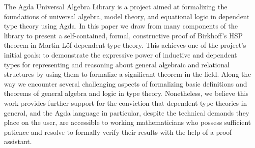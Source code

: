 The Agda Universal Algebra Library is a project aimed at formalizing the foundations of
universal algebra, model theory, and equational logic in dependent type theory
using Agda. In this paper we draw from many components of the library to present
a self-contained, formal, constructive proof of Birkhoff's HSP theorem in
Martin-L\"of dependent type theory.
This achieves one of the project's initial goals: to demonstrate the expressive power of
inductive and dependent types for representing and reasoning about general
algebraic and relational structures by using them to formalize a significant theorem in the field.
\ifshort\else
Along the way we encounter several challenging aspects of formalizing basic
definitions and theorems of general algebra and logic in type theory. Nonetheless,
we believe this work provides further support for the conviction that dependent
type theories in general, and the Agda language in particular, despite the
technical demands they place on the user, are accessible to working
mathematicians who possess sufficient patience and resolve to formally verify
their results with the help of a proof assistant.
\fi